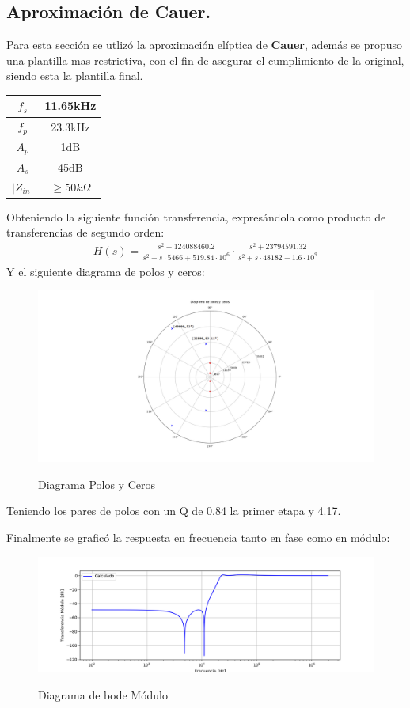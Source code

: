 \subsection{Aproximación de Cauer.}
Para esta sección se utlizó la aproximación elíptica de \textbf{Cauer}, además se propuso una plantilla mas restrictiva, con el fin de asegurar el cumplimiento de la original, siendo esta la plantilla final.
\begin{table}[H]
\centering
\begin{tabular}{|c|c|}
\hline
$f_s$      & 11.65kHz          \\ \hline
$f_p$      & 23.3kHz           \\ \hline
$A_p$      & 1dB               \\ \hline
$A_s$      & 45dB              \\ \hline
$|Z_{in}|$ & $\geq 50k \Omega$ \\ \hline
\end{tabular}
\end{table}
Obteniendo la siguiente función transferencia, expresándola como producto de transferencias de segundo orden:
\begin{align}
	H(s)=\frac{ {s}^{2}+ 124088460.2 
 }{s^2+s\cdot 5466 + 519.84\cdot 10^6 } \cdot \frac{  {s}^{2}+
 23794591.32 }{s^2+s\cdot 48182 + 1.6\cdot 10^9 }
\label{eq:trans}
\end{align}
Y el siguiente diagrama de polos y ceros:
\begin{figure}[H]
	\centering
	\includegraphics[width=\textwidth]{Imagenes-Ej3/DiagramaPolosYCeros.png}
	\label{fig:poleZeroDiag}
	\caption{Diagrama Polos y Ceros}
\end{figure}

Teniendo los pares de polos con un Q de 0.84 la primer etapa y 4.17.


Finalmente se graficó la respuesta en frecuencia tanto en fase como en módulo:
\begin{figure}[H]
	\centering
	\includegraphics[width=\textwidth]{Imagenes-Ej3/BodeCalc.png}
	\label{fig:Bodecalc}
	\caption{Diagrama de bode Módulo}
\end{figure}

